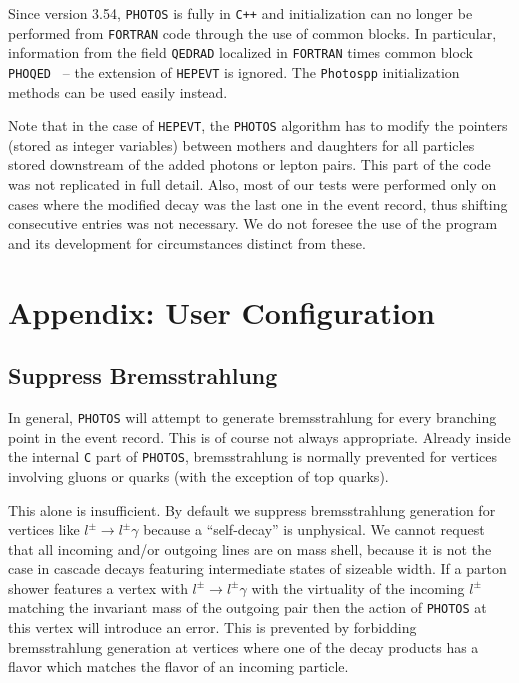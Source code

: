 \documentclass[]{Photos_interface_design}
\begin{document}
Since version 3.54, {\tt PHOTOS} is fully in {\tt C++} and initialization can no longer
be performed from {\tt FORTRAN} code through the use of common blocks. 
In particular, information from the field 
{\tt QEDRAD} localized in {\tt  FORTRAN} times common block 
{\tt PHOQED } -- the extension of {\tt HEPEVT} is ignored. %
The  {\tt Photospp} initialization methods can be used easily instead.

Note that in the case of {\tt HEPEVT}, the {\tt PHOTOS} algorithm
has to modify the pointers (stored as integer variables) between mothers 
and daughters for all particles stored downstream of the added 
photons or lepton pairs. This part of the code was not replicated in full detail. 
Also, most of
our tests were performed only on cases where the modified decay was the last one in the event record, thus  shifting consecutive entries was not necessary.
We do not foresee the use of the program and its development for circumstances distinct from these.

\section{Appendix: User Configuration}
\label{sec:User Configuration}

\subsection{Suppress Bremsstrahlung}
\label{section:suppress}

In general, {\tt PHOTOS} will attempt to generate bremsstrahlung for every 
branching point in the event record. This is of course not always appropriate.
Already inside the internal {\tt C} part of {\tt PHOTOS}, 
bremsstrahlung is normally prevented for vertices involving gluons or quarks 
(with the exception of top quarks).

This alone is insufficient. By default we suppress bremsstrahlung
generation for vertices like $l^\pm \to l^\pm \gamma$ because a
``self-decay'' is unphysical. We cannot request that all incoming
and/or outgoing lines are on mass shell, because it is not the case in
cascade decays featuring intermediate states of sizeable width. If a
parton shower features a vertex with $l^\pm \to l^\pm \gamma$ with the
virtuality of the incoming $l^\pm$ matching the invariant mass of the
outgoing pair then the action of {\tt PHOTOS} at this vertex will
introduce an error.  This is prevented by forbidding bremsstrahlung
generation at vertices where one of the decay products has a flavor
which matches the flavor of an incoming particle.
\end{document}
